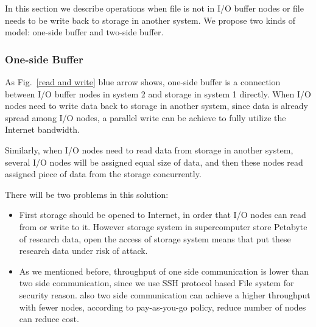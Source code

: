 In this section we describe operations when file is not in I/O buffer nodes or file needs to be write back to storage in another system.
We propose two kinds of model: one-side buffer and two-side buffer.

\subsubsection{One-side Buffer}

As Fig.~\ref{read and write} blue arrow shows, one-side buffer is a connection between I/O buffer nodes in system 2 and storage in system 1 directly.
When I/O nodes need to write data back to storage in another system, since data is already spread among I/O nodes, a parallel write can be achieve to fully utilize the Internet bandwidth.

Similarly, when I/O nodes need to read data from storage in another system, several I/O nodes will be assigned equal size of data, and then these nodes read assigned piece of data from the storage concurrently.

There will be two problems in this solution:
\begin{itemize}
	\item First storage should be opened to Internet, in order that I/O nodes can read from or write to it.
		However storage system in supercomputer store Petabyte of research data, open the access of storage system means that put these research data under risk of attack.
	\item As we mentioned before, throughput of one side communication is lower than two side communication, since we use SSH protocol based File system for security reason.
		also two side communication can achieve a higher throughput with fewer nodes, according to pay-as-you-go policy, reduce number of nodes can reduce cost.
\end{itemize}


